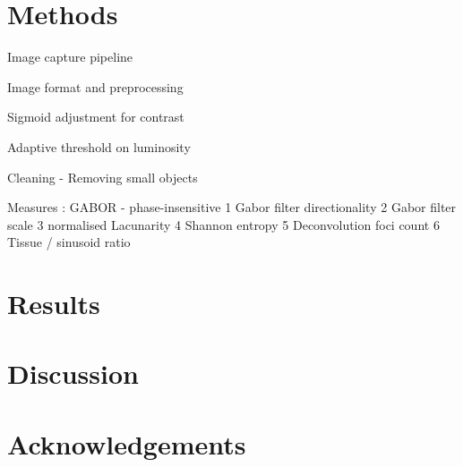 \documentclass[10pt]{article}
\begin{document}
\section*{Methods}

Image capture pipeline



Image format and preprocessing



Sigmoid adjustment for contrast



Adaptive threshold on luminosity



Cleaning - Removing small objects



Measures :
GABOR - phase-insensitive
1 Gabor filter directionality
2 Gabor filter scale
3 normalised Lacunarity
4 Shannon entropy
5 Deconvolution foci count
6 Tissue / sinusoid ratio











\section*{Results}

	 




























\section*{Discussion}











\section*{Acknowledgements}
\end{document}
